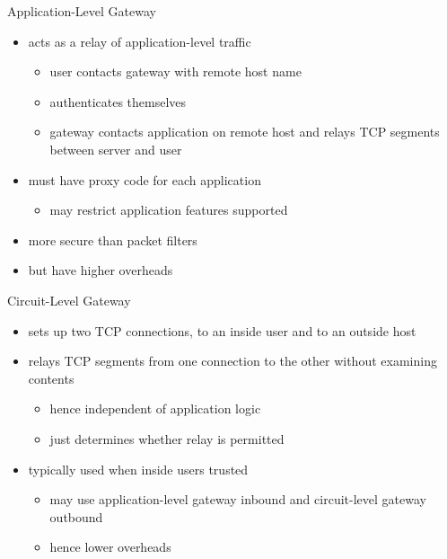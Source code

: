 \documentclass{beamer}
\begin{document}
\begin{frame}{Application-Level Gateway}
  \begin{itemize}
  \item acts as a relay of application-level traffic 
    \begin{itemize}
    \item user contacts gateway with remote host name 
    \item authenticates themselves 
    \item gateway contacts application on remote host and 
      relays TCP segments between server and user 
    \end{itemize}
  \item must have proxy code for each application 
    \begin{itemize}
    \item may restrict application features supported 
    \end{itemize}
  \item more secure than packet filters 
  \item but have higher overheads 
  \end{itemize}
\end{frame}

\begin{frame}{Circuit-Level Gateway}
  \begin{itemize}
  \item sets up two TCP connections, to an inside user 
    and to an outside host 
  \item relays TCP segments from one connection to 
    the other without examining contents 
    \begin{itemize}
    \item hence independent of application logic 
    \item just determines whether relay is permitted 
    \end{itemize}
  \item typically used when inside users trusted 
    \begin{itemize}
    \item may use application-level gateway inbound and 
      circuit-level gateway outbound 
    \item hence lower overheads
    \end{itemize}
  \end{itemize}
\end{frame}
\end{document}
